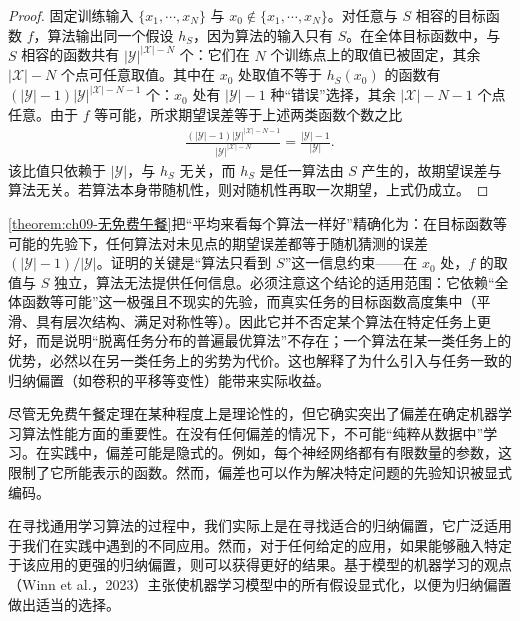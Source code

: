 \documentclass[../../main.tex]{subfiles}
\begin{document}
\begin{proof}
固定训练输入 $\{x_{1},\cdots,x_{N}\}$ 与 $x_{0}\notin\{x_{1},\cdots,x_{N}\}$。对任意与 $S$ 相容的目标函数 $f$，算法输出同一个假设 $h_{S}$，因为算法的输入只有 $S$。在全体目标函数中，与 $S$ 相容的函数共有 $|\mathcal{Y}|^{|\mathcal{X}|-N}$ 个：它们在 $N$ 个训练点上的取值已被固定，其余 $|\mathcal{X}|-N$ 个点可任意取值。其中在 $x_{0}$ 处取值不等于 $h_{S}(x_{0})$ 的函数有 $(|\mathcal{Y}|-1)|\mathcal{Y}|^{|\mathcal{X}|-N-1}$ 个：$x_{0}$ 处有 $|\mathcal{Y}|-1$ 种“错误”选择，其余 $|\mathcal{X}|-N-1$ 个点任意。由于 $f$ 等可能，所求期望误差等于上述两类函数个数之比
\begin{align*}
\frac{(|\mathcal{Y}|-1)|\mathcal{Y}|^{|\mathcal{X}|-N-1}}{|\mathcal{Y}|^{|\mathcal{X}|-N}}=\frac{|\mathcal{Y}|-1}{|\mathcal{Y}|}.
\end{align*}
该比值只依赖于 $|\mathcal{Y}|$，与 $h_{S}$ 无关，而 $h_{S}$ 是任一算法由 $S$ 产生的，故期望误差与算法无关。若算法本身带随机性，则对随机性再取一次期望，上式仍成立。
\end{proof}

\begin{remark}\cref{theorem:ch09-无免费午餐}把“平均来看每个算法一样好”精确化为：在目标函数等可能的先验下，任何算法对未见点的期望误差都等于随机猜测的误差 $(|\mathcal{Y}|-1)/|\mathcal{Y}|$。证明的关键是“算法只看到 $S$”这一信息约束——在 $x_{0}$ 处，$f$ 的取值与 $S$ 独立，算法无法提供任何信息。必须注意这个结论的适用范围：它依赖“全体函数等可能”这一极强且不现实的先验，而真实任务的目标函数高度集中（平滑、具有层次结构、满足对称性等）。因此它并不否定某个算法在特定任务上更好，而是说明“脱离任务分布的普遍最优算法”不存在；一个算法在某一类任务上的优势，必然以在另一类任务上的劣势为代价。这也解释了为什么引入与任务一致的归纳偏置（如卷积的平移等变性）能带来实际收益。
\end{remark}

尽管无免费午餐定理在某种程度上是理论性的，但它确实突出了偏差在确定机器学习算法性能方面的重要性。在没有任何偏差的情况下，不可能“纯粹从数据中”学习。在实践中，偏差可能是隐式的。例如，每个神经网络都有有限数量的参数，这限制了它所能表示的函数。然而，偏差也可以作为解决特定问题的先验知识被显式编码。

在寻找通用学习算法的过程中，我们实际上是在寻找适合的归纳偏置，它广泛适用于我们在实践中遇到的不同应用。然而，对于任何给定的应用，如果能够融入特定于该应用的更强的归纳偏置，则可以获得更好的结果。基于模型的机器学习的观点（Winn et al.，2023）主张使机器学习模型中的所有假设显式化，以便为归纳偏置做出适当的选择。
\end{document}
